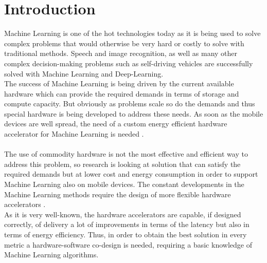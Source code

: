 \chapter{Introduction}
Machine Learning is one of the hot technologies today as it is being used to solve complex problems that would otherwise be very hard or costly to solve with traditional methods. Speech and image recognition, as well as many other complex decision-making problems such as self-driving vehicles are successfully solved with Machine Learning and Deep-Learning. \\
The success of Machine Learning is being driven by the current available hardware which can provide the required demands in terms of storage and compute capacity. But obviously as problems scale so do the demands and thus special hardware is being developed to address these needs. As soon as the mobile devices are well spread, the need of a custom energy efficient hardware accelerator
for Machine Learning is needed \cite{paper:2}.\\\\
The use of commodity hardware is not the most effective and efficient way to address this problem, so research is looking at solution that can satisfy the required demands but at lower cost and energy consumption in order to support Machine Learning also on mobile devices.
The constant developments in the Machine Learning methods require the design of more flexible hardware accelerators \cite{paper:1} \cite{paper:2}.\\
As it is very well-known, the hardware accelerators are capable, if designed correctly, of delivery a lot of improvements in terms of the latency but also in terms of energy efficiency\cite{paper:29}. Thus, in order to obtain the best solution in every metric a hardware-software co-design is needed, requiring a basic knowledge of Machine Learning algorithms.\\\\

